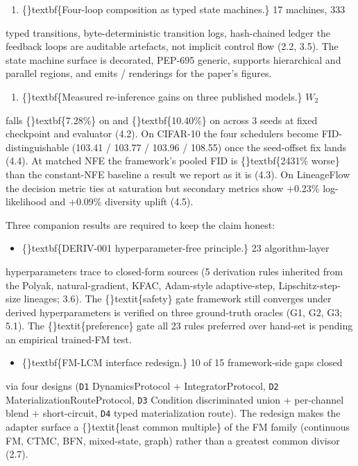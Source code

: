 \documentclass{article}
\begin{document}
\begin{enumerate}
\item \{\}textbf\{Four-loop composition as typed state machines.\} 17 machines, 333
\end{enumerate}
typed transitions, byte-deterministic transition logs, hash-chained ledger  the feedback loops are auditable artefacts, not implicit control flow (2.2, 3.5). The state machine surface is decorated, PEP-695 generic, supports hierarchical and parallel regions, and emits  /  renderings for the paper's figures.

\begin{enumerate}
\item \{\}textbf\{Measured re-inference gains on three published models.\} $W_2$
\end{enumerate}
falls \{\}textbf\{7.28\%\} on  and \{\}textbf\{10.40\%\} on  across 3 seeds at fixed checkpoint and evaluator (4.2). On CIFAR-10 the four schedulers become FID-distinguishable (103.41 / 103.77 / 103.96 / 108.55) once the seed-offset fix lands (4.4). At matched NFE the framework's pooled FID is \{\}textbf\{2431\% worse\} than the constant-NFE baseline  a result we report as it is (4.3). On LineageFlow the decision metric ties at saturation but secondary metrics show +0.23\% log-likelihood and +0.09\% diversity uplift (4.5).

Three companion results are required to keep the claim honest:

\begin{itemize}
\item \{\}textbf\{DERIV-001 hyperparameter-free principle.\} 23 algorithm-layer
\end{itemize}
hyperparameters trace to closed-form sources (5 derivation rules inherited from the Polyak, natural-gradient, KFAC, Adam-style adaptive-step, Lipschitz-step-size lineages; 3.6). The \{\}textit\{safety\} gate  framework still converges under derived hyperparameters  is verified on three ground-truth oracles (G1, G2, G3; 5.1). The \{\}textit\{preference\} gate  all 23 rules preferred over hand-set  is pending an empirical trained-FM test.

\begin{itemize}
\item \{\}textbf\{FM-LCM interface redesign.\} 10 of 15 framework-side gaps closed
\end{itemize}
via four designs (\texttt{D1} DynamicsProtocol + IntegratorProtocol, \texttt{D2} MaterializationRouteProtocol, \texttt{D3} Condition discriminated union + per-channel blend + short-circuit, \texttt{D4} typed materialization route). The redesign makes the adapter surface a \{\}textit\{least common multiple\} of the FM family (continuous FM, CTMC, BFN, mixed-state, graph) rather than a greatest common divisor (2.7).
\end{document}
